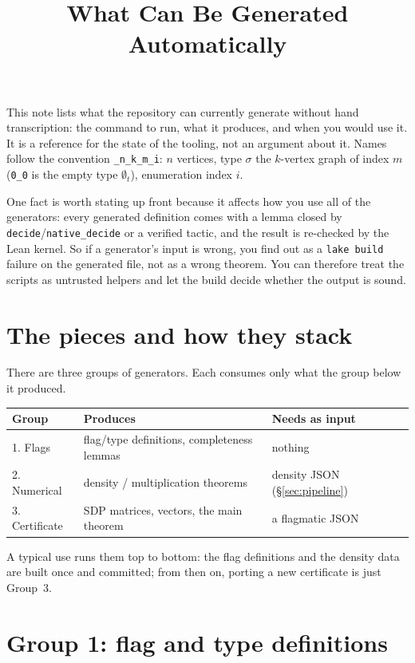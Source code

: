 \documentclass[11pt]{article}
\title{What Can Be Generated Automatically}
\author{}
\date{}
\begin{document}
\maketitle

This note lists what the repository can currently generate without hand
transcription: the command to run, what it produces, and when you would
use it. It is a reference for the state of the tooling, not an argument
about it. Names follow the convention \texttt{\_n\_k\_m\_i}: $n$ vertices,
type $\sigma$ the $k$-vertex graph of index $m$ (\texttt{0\_0} is the empty
type $\emptyset_t$), enumeration index $i$.

One fact is worth stating up front because it affects how you use all of
the generators: every generated definition comes with a lemma closed by
\texttt{decide}/\texttt{native\_decide} or a verified tactic, and the
result is re-checked by the Lean kernel. So if a generator's input is
wrong, you find out as a \texttt{lake build} failure on the generated
file, not as a wrong theorem. You can therefore treat the scripts as
untrusted helpers and let the build decide whether the output is sound.

\section{The pieces and how they stack}

There are three groups of generators. Each consumes only what the group
below it produced.

\begin{center}
\begin{tabular}{lll}
\toprule
Group & Produces & Needs as input \\
\midrule
1. Flags        & flag/type definitions, completeness lemmas & nothing \\
2. Numerical    & density / multiplication theorems & density JSON (\S\ref{sec:pipeline}) \\
3. Certificate  & SDP matrices, vectors, the main theorem & a flagmatic JSON \\
\bottomrule
\end{tabular}
\end{center}

A typical use runs them top to bottom: the flag definitions and the
density data are built once and committed; from then on, porting a new
certificate is just Group~3.

\section{Group 1: flag and type definitions}
\label{sec:flags}
\end{document}
